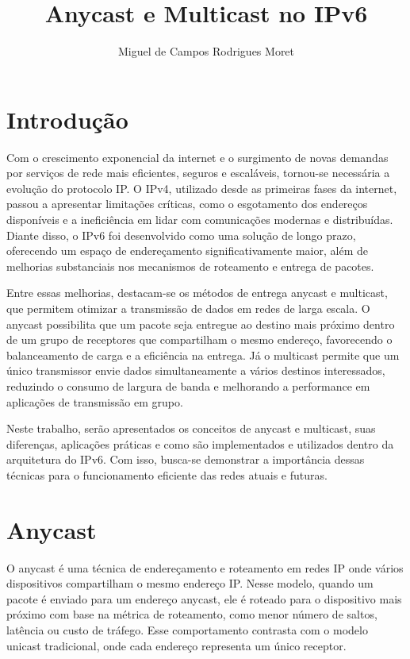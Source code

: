 \documentclass[12pt]{article}
\title{Anycast e Multicast no IPv6}
\author{Miguel de Campos Rodrigues Moret}
\date{}
\begin{document}
\maketitle

\tableofcontents
\newpage

\section{Introdução}

Com o crescimento exponencial da internet e o surgimento de novas demandas por serviços de rede mais eficientes, seguros e escaláveis, tornou-se necessária a evolução do protocolo IP. O IPv4, utilizado desde as primeiras fases da internet, passou a apresentar limitações críticas, como o esgotamento dos endereços disponíveis e a ineficiência em lidar com comunicações modernas e distribuídas. Diante disso, o IPv6 foi desenvolvido como uma solução de longo prazo, oferecendo um espaço de endereçamento significativamente maior, além de melhorias substanciais nos mecanismos de roteamento e entrega de pacotes.

Entre essas melhorias, destacam-se os métodos de entrega anycast e multicast, que permitem otimizar a transmissão de dados em redes de larga escala. O anycast possibilita que um pacote seja entregue ao destino mais próximo dentro de um grupo de receptores que compartilham o mesmo endereço, favorecendo o balanceamento de carga e a eficiência na entrega. Já o multicast permite que um único transmissor envie dados simultaneamente a vários destinos interessados, reduzindo o consumo de largura de banda e melhorando a performance em aplicações de transmissão em grupo.

Neste trabalho, serão apresentados os conceitos de anycast e multicast, suas diferenças, aplicações práticas e como são implementados e utilizados dentro da arquitetura do IPv6. Com isso, busca-se demonstrar a importância dessas técnicas para o funcionamento eficiente das redes atuais e futuras.

\section{Anycast}

O anycast é uma técnica de endereçamento e roteamento em redes IP onde vários dispositivos compartilham o mesmo endereço IP. Nesse modelo, quando um pacote é enviado para um endereço anycast, ele é roteado para o dispositivo mais próximo com base na métrica de roteamento, como menor número de saltos, latência ou custo de tráfego. Esse comportamento contrasta com o modelo unicast tradicional, onde cada endereço representa um único receptor.
\end{document}
